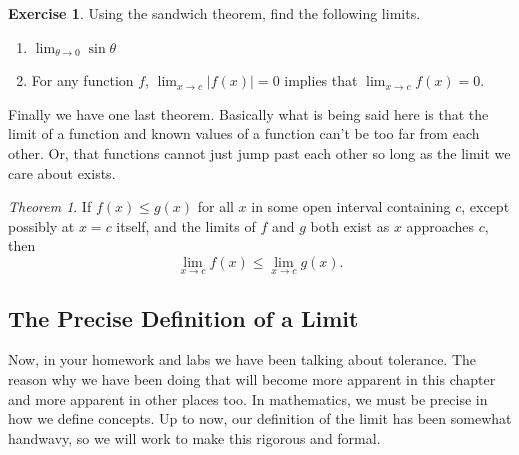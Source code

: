 \documentclass[leqno]{article}
\theoremstyle{definition}
\newtheorem{exercise}{Exercise}[section]
\theoremstyle{remark}
\theoremstyle{theorem}
\newtheorem{theorem}{Theorem}[section]
\begin{document}
\begin{exercise} Using the sandwich theorem, find the following limits.
\begin{enumerate}[1.]
\item $\lim_{\theta\to 0} \sin \theta$
\item For any function $f$, $\lim_{x\to c}|f(x)|=0$ implies that $\lim_{x\to c}f(x)=0$.
\end{enumerate}
\vspace*{5cm}
\end{exercise}

Finally we have one last theorem.  Basically what is being said here is that the limit of a function and known values of a function can't be too far from each other.  Or, that functions cannot just jump past each other so long as the limit we care about exists.

\begin{theorem}
If $f(x)\leq g(x)$ for all $x$ in some open interval containing $c$, except possibly at $x=c$ itself, and the limits of $f$ and $g$ both exist as $x$ approaches $c$, then
\[
\lim_{x\to c} f(x) \leq \lim_{x\to c} g(x).
\]
\end{theorem}

\subsection{The Precise Definition of a Limit}

Now, in your homework and labs we have been talking about tolerance.  The reason why we have been doing that will become more apparent in this chapter and more apparent in other places too.  In mathematics, we must be precise in how we define concepts.  Up to now, our definition of the limit has been somewhat handwavy, so we will work to make this rigorous and formal.
\end{document}

